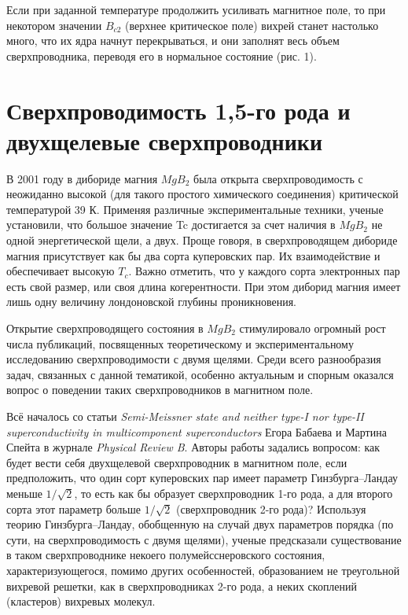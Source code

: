 Если при заданной температуре продолжить усиливать магнитное поле, то при 
некотором значении \( B_{c2} \) (верхнее критическое поле) вихрей станет 
настолько много, что их ядра начнут перекрываться, и они заполнят весь 
объем сверхпроводника, переводя его в нормальное состояние (рис. 1). 

\section{Сверхпроводимость 1,5-го рода и двухщелевые сверхпроводники}
В 2001 году в дибориде магния \( MgB_2 \) была открыта сверхпроводимость с 
неожиданно высокой (для такого простого химического соединения) критической 
температурой 39 К. Применяя различные экспериментальные техники, ученые 
установили, что большое значение Tc достигается за счет наличия в \( MgB_2 \) 
не одной энергетической щели, а двух. Проще говоря, в сверхпроводящем дибориде 
магния присутствует как бы два сорта куперовских пар. Их взаимодействие и 
обеспечивает высокую \( T_c \). Важно отметить, что у каждого сорта 
электронных пар есть свой размер, или своя длина когерентности. При этом 
диборид магния имеет лишь одну величину лондоновской глубины проникновения.

Открытие сверхпроводящего состояния в \( MgB_2 \) стимулировало огромный рост 
числа публикаций, посвященных теоретическому и экспериментальному исследованию 
сверхпроводимости с двумя щелями. Среди всего разнообразия задач, связанных с 
данной тематикой, особенно актуальным и спорным оказался вопрос о поведении 
таких сверхпроводников в магнитном поле.

Всё началось со статьи \emph{Semi-Meissner state and neither type-I nor 
type-II superconductivity in multicomponent superconductors} Егора Бабаева и 
Мартина Спейта в журнале \emph{Physical Review B}. Авторы работы задались 
вопросом: как будет вести себя двухщелевой сверхпроводник в магнитном поле, 
если предположить, что один сорт куперовских пар имеет параметр 
Гинзбурга–Ландау меньше \( 1/\sqrt{2} \), то есть как бы образует 
сверхпроводник 1-го рода, а для второго сорта этот параметр больше 
\( 1/\sqrt{2} \) (сверхпроводник 2-го рода)? Используя теорию 
Гинзбурга–Ландау, обобщенную на случай двух параметров порядка (по сути, 
на сверхпроводимость с двумя щелями), ученые предсказали существование в 
таком сверхпроводнике некоего полумейсснеровского состояния, 
характеризующегося, помимо других особенностей, образованием не треугольной 
вихревой решетки, как в сверхпроводниках 2-го рода, а неких скоплений 
(кластеров) вихревых молекул.

